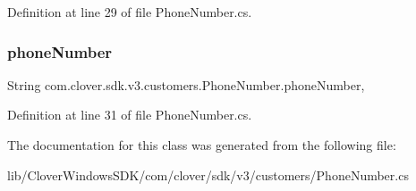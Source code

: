 Definition at line 29 of file Phone\+Number.\+cs.

\mbox{\label{classcom_1_1clover_1_1sdk_1_1v3_1_1customers_1_1_phone_number_a00f32c354ed57ac1e607deff5a6066d0}} 
\subsubsection{\texorpdfstring{phone\+Number}{phoneNumber}}
{\footnotesize\ttfamily String com.\+clover.\+sdk.\+v3.\+customers.\+Phone\+Number.\+phone\+Number\hspace{0.3cm}{\ttfamily [get]}, {\ttfamily [set]}}



Definition at line 31 of file Phone\+Number.\+cs.



The documentation for this class was generated from the following file\+:\begin{DoxyCompactItemize}
\item 
lib/\+Clover\+Windows\+S\+D\+K/com/clover/sdk/v3/customers/Phone\+Number.\+cs\end{DoxyCompactItemize}
